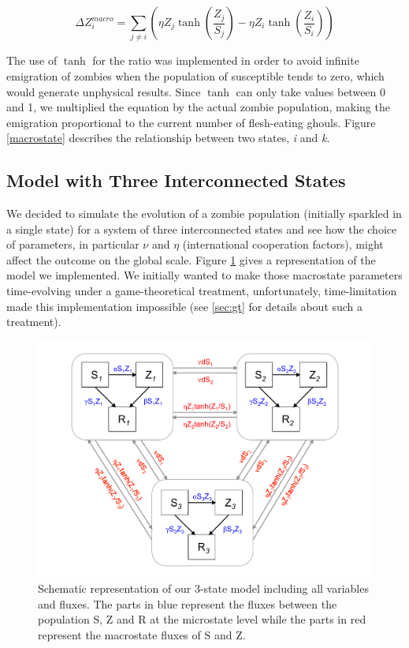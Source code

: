 \documentclass[11pt]{article} %
\begin{document}
\bigskip
\begin{equation} \label{eq:zmacro}
\Delta Z_{i}^{macro} = \sum_{j\neq i}{\left( \eta Z_{j}\tanh \left( \frac{Z_{j}}{S_{j}}\right) -\eta Z_{i}\tanh \left( \frac{Z_{i}}{S_{i}}\right) \right)}
\end{equation}
\bigskip

The use of $\tanh$ for the ratio was implemented in order to avoid infinite emigration of zombies when the population of susceptible tends to zero, which would generate unphysical results. Since $\tanh$ can only take values between 0 and 1, we multiplied the equation by the actual zombie population, making the emigration proportional to the current number of flesh-eating ghouls. Figure \ref{macrostate} describes the relationship between two states, \textit{i} and \textit{k}.





\subsection{Model with Three Interconnected States}\indent

We decided to simulate the evolution of a zombie population (initially sparkled in a single state) for a system of three interconnected states and see how the choice of parameters, in particular $\nu$ and $\eta$ (international cooperation factors), might affect the outcome on the global scale. Figure \ref{totalmodel} gives a representation of the model we implemented. We initially wanted to make those macrostate parameters time-evolving under a game-theoretical treatment, unfortunately, time-limitation made this implementation impossible (see \ref{sec:gt} for details about such a treatment).
 
\begin{figure}[h!]
\centerline{
\includegraphics[scale=0.43]{../images/Powerpoint_figures/total_model.pdf}}
\caption{Schematic representation of our 3-state model including all variables and fluxes. The parts in blue represent the fluxes between the population S, Z and R at the microstate level while the parts in red represent the macrostate fluxes of S and Z.\label{totalmodel} }
\end{figure}
\end{document}
